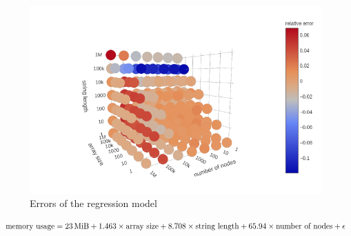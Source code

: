 \documentclass{article}
\begin{document}
\begin{figure}
  \centering
  \includegraphics[width=\textwidth]{../io_local_tests/3d_scatter.png}
  \caption{Errors of the regression model}
\end{figure}

\[
  \text{memory usage} = \SI{23}{\mebi\byte} + 1.463 \times \text{array size} +
  8.708 \times \text{string length} + 65.94 \times \text{number of nodes} +
  \epsilon
\]
\end{document}
